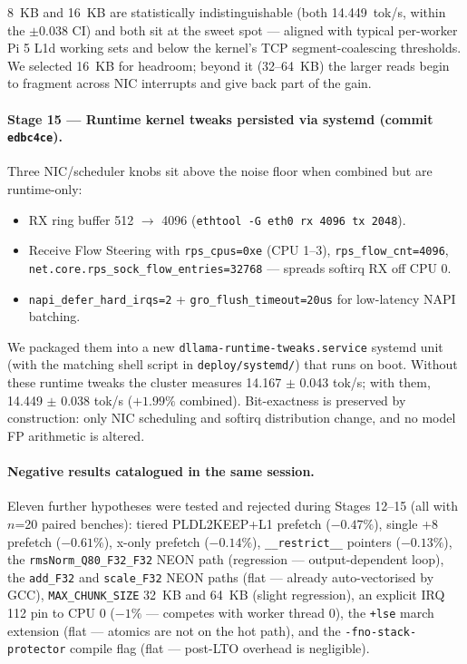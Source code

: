 \documentclass[10pt,a4paper]{article}
\begin{document}
8~KB and 16~KB are statistically indistinguishable (both 14.449~tok/s, within the $\pm$0.038 CI) and both sit at the sweet spot --- aligned with typical per-worker Pi 5 L1d working sets and below the kernel's TCP segment-coalescing thresholds. We selected 16~KB for headroom; beyond it (32--64~KB) the larger reads begin to fragment across NIC interrupts and give back part of the gain.

\paragraph{Stage 15 --- Runtime kernel tweaks persisted via systemd (commit \texttt{edbc4ce}).}
Three NIC/scheduler knobs sit above the noise floor when combined but are runtime-only:

\begin{itemize}
  \item RX ring buffer 512 $\rightarrow$ 4096 (\texttt{ethtool -G eth0 rx 4096 tx 2048}).
  \item Receive Flow Steering with \texttt{rps\_cpus=0xe} (CPU 1--3), \texttt{rps\_flow\_cnt=4096}, \texttt{net.core.rps\_sock\_flow\_entries=32768} --- spreads softirq RX off CPU 0.
  \item \texttt{napi\_defer\_hard\_irqs=2} + \texttt{gro\_flush\_timeout=20us} for low-latency NAPI batching.
\end{itemize}

We packaged them into a new \texttt{dllama-runtime-tweaks.service} systemd unit (with the matching shell script in \texttt{deploy/systemd/}) that runs on boot. Without these runtime tweaks the cluster measures 14.167 $\pm$ 0.043 tok/s; with them, 14.449 $\pm$ 0.038 tok/s ($+1.99\%$ combined). Bit-exactness is preserved by construction: only NIC scheduling and softirq distribution change, and no model FP arithmetic is altered.

\paragraph{Negative results catalogued in the same session.}
Eleven further hypotheses were tested and rejected during Stages 12--15 (all with $n$=20 paired benches): tiered PLDL2KEEP+L1 prefetch ($-0.47\%$), single +8 prefetch ($-0.61\%$), x-only prefetch ($-0.14\%$), \texttt{\_\_restrict\_\_} pointers ($-0.13\%$), the \texttt{rmsNorm\_Q80\_F32\_F32} NEON path (regression --- output-dependent loop), the \texttt{add\_F32} and \texttt{scale\_F32} NEON paths (flat --- already auto-vectorised by GCC), \texttt{MAX\_CHUNK\_SIZE} 32~KB and 64~KB (slight regression), an explicit IRQ 112 pin to CPU 0 ($-1\%$ --- competes with worker thread 0), the \texttt{+lse} march extension (flat --- atomics are not on the hot path), and the \texttt{-fno-stack-protector} compile flag (flat --- post-LTO overhead is negligible).
\end{document}
